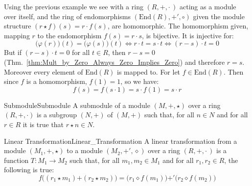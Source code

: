     \begin{example}
        Using the previous example we see with a ring $(R,+,\cdot\,)$ acting as
        a module over itself, and the ring of endomorphisms
        $(\textrm{End}(R),\boldsymbol{+}',\circ)$ given the module structure
        $(r\star{f})(s)=r\cdot{f}(s)$, are homomorphic. The homomorphism given,
        mapping $r$ to the endomorphism $f(s)=r\cdot{s}$, is bijective. It is
        injective for:
        \begin{subequations}
            \begin{equation}
                \big(\varphi(r)\big)(t)=\big(\varphi(s)\big)(t)
                \Leftrightarrow
                r\cdot{t}=s\cdot{t}
                \Leftrightarrow
                (r-s)\cdot{t}=0
            \end{equation}
        \end{subequations}
        But if $(r-s)\cdot{t}=0$ for all $t\in{R}$, then $r-s=0$
        (Thm.~\ref{thm:Mult_by_Zero_Always_Zero_Implies_Zero}) and therefore
        $r=s$. Moreover every element of $\textrm{End}(R)$ is mapped to. For let
        $f\in\textrm{End}(R)$. Then since $f$ is a homomorphism, $f(1)=1$, so
        we have:
        \begin{equation}
            f(s)=f(s\cdot{1})=s\cdot{f}(1)=s\cdot{r}
        \end{equation}
    \end{example}
    \begin{fdefinition}{Submodule}{Submodule}
        A \gls{submodule} of a \gls{module}
        $(M,\boldsymbol{+},\star)$ over a ring $(R,+,\cdot)$ is a \gls{subgroup}
        $(N,\boldsymbol{+})$ of $(M,\boldsymbol{+})$ such that, for all
        $n\in{N}$ and for all $r\in{R}$ it is true that $r\star{n}\in{N}$.
    \end{fdefinition}
    \begin{fdefinition}{Linear Transformation}{Linear_Transformation}
        A linear transformation from a module $(M_{1},\boldsymbol{+},\star)$ to
        a module $(M_{2},\boldsymbol{+}',\diamond)$ over a ring
        $(R,+,\cdot\,)$ is a function $T:M_{1}\rightarrow{M}_{2}$ such that,
        for all $m_{1},m_{2}\in{M}_{1}$ and for all $r_{1},r_{2}\in{R}$, the
        following is true:
        \begin{equation*}
            f\big((r_{1}\star{m}_{1})\boldsymbol{+}(r_{2}\star{m}_{2})\big)
            =\big(r_{1}\diamond{f}(m_{1})\big)\boldsymbol{+}'
                \big(r_{2}\diamond{f}(m_{2})\big)
        \end{equation*}
    \end{fdefinition}
